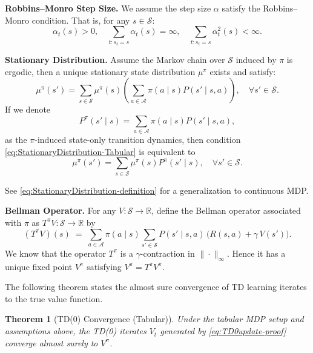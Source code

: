\documentclass[
]{book}
\newtheorem{theorem}{Theorem}[chapter]
\theoremstyle{definition}
\theoremstyle{definition}
\theoremstyle{definition}
\theoremstyle{definition}
\theoremstyle{remark}
\begin{document}
\textbf{Robbins--Monro Step Size.} We assume the step size \(\alpha\) satisfy the Robbins--Monro condition. That is, for any \(s \in \mathcal{S}\):
\[
\alpha_t(s) >0, \quad \sum_{t: s_t = s} \alpha_t(s) = \infty, \quad \sum_{t: s_t = s} \alpha^2_t(s) < \infty.
\]

\textbf{Stationary Distribution.}
Assume the Markov chain over \(\mathcal{S}\) induced by \(\pi\) is ergodic, then a unique stationary state distribution \(\mu^\pi\) exists and satisfy:
\begin{equation}
\mu^\pi(s') = \sum_{s \in \mathcal{S}} \mu^\pi(s) \left( \sum_{a \in \mathcal{A}}  \pi(a \mid s) P(s' \mid s, a) \right), \quad \forall s' \in \mathcal{S}.
\label{eq:StationaryDistribution-Tabular}
\end{equation}
If we denote
\begin{equation}
P^\pi(s' \mid s) = \sum_{a \in \mathcal{A}} \pi(a \mid s) P(s' \mid s,a),
\label{eq:TabularStateOnlyTransition}
\end{equation}
as the \(\pi\)-induced state-only transition dynamics, then condition \eqref{eq:StationaryDistribution-Tabular} is equivalent to
\begin{equation}
\mu^\pi(s') = \sum_{s \in \mathcal{S}} \mu^\pi(s) P^\pi (s' \mid s), \quad \forall s' \in \mathcal{S}.
\label{eq:StationaryDistribution-Tabular-State-Only}
\end{equation}

See \eqref{eq:StationaryDistribution-definition} for a generalization to continuous MDP.

\textbf{Bellman Operator.} For any \(V:\mathcal S\to\mathbb R\), define the Bellman operator associated with \(\pi\) as \(T^\pi V:\mathcal S\to\mathbb R\) by
\begin{equation}
(T^\pi V)(s)\;=\;\sum_{a\in\mathcal A}\pi(a\mid s)\sum_{s'\in\mathcal S} P(s'\mid s,a)\,\Big( R(s,a)+\gamma\,V(s')\Big).
\label{eq:BellmanOperatorRestate-TDConvergenceProof}
\end{equation}
We know that the operator \(T^\pi\) is a \(\gamma\)-contraction in \(\|\cdot\|_\infty\). Hence it has a unique fixed point \(V^\pi\) satisfying \(V^\pi=T^\pi V^\pi\).

The following theorem states the almost sure convergence of TD learning iterates to the true value function.

\begin{theorem}[TD(0) Convergence (Tabular)]
\protect\hypertarget{thm:TD0ConvergenceTabular}{}\label{thm:TD0ConvergenceTabular}Under the tabular MDP setup and assumptions above, the TD(0) iterates \(V_t\) generated by \eqref{eq:TD0update-proof} converge almost surely to \(V^\pi\).
\end{theorem}
\end{document}
